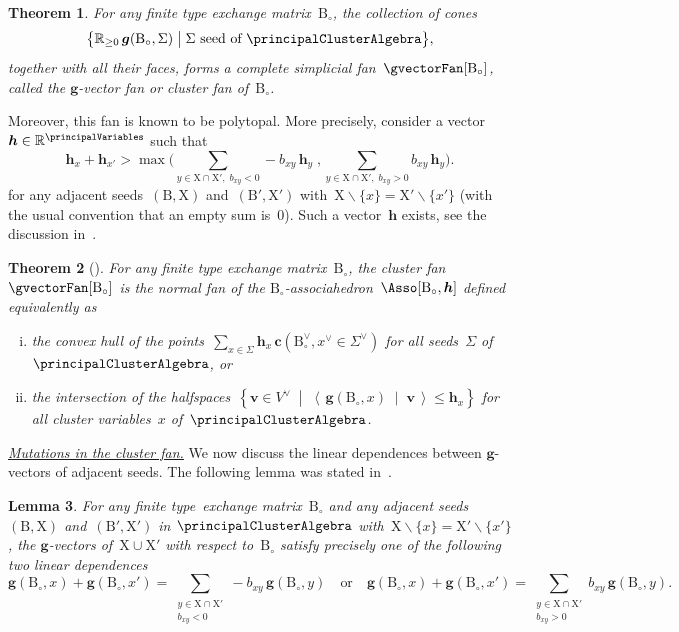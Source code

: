 \documentclass{amsart}
\newtheorem{theorem}{Theorem}[section]
\newtheorem{lemma}[theorem]{Lemma}
\theoremstyle{definition}
\newcommand{\R}{\mathbb{R}} %
\renewcommand{\b}[1]{{\boldsymbol{#1}}} %
\newcommand{\set}[2]{\left\{ #1 \;\middle|\; #2 \right\}} %
\newcommand{\bigset}[2]{\big\{ #1 \;\big|\; #2 \big\}} %
\newcommand{\ssm}{\smallsetminus} %
\newcommand{\dotprod}[2]{\left\langle \, #1 \; \middle| \; #2 \, \right\rangle} %
\newcommand{\darkblue}{\color{darkblue}} %
\newcommand{\defn}[1]{\textsl{\darkblue #1}} %
\newcommand{\para}[1]{\medskip\noindent\uline{\textit{#1.}}} %
\newcommand{\gvectorFull}[2]{\b{g}(#1,#2)} %
\newcommand{\gvectorsFull}[2]{\b{g}(#1,#2)} %
\newcommand{\cvectorFull}[3]{\mathbf{c}(#1,#3 \in #2)} %
\newcommand{\seed}{\Sigma} %
\newcommand{\cluster}{\mathrm{X}} %
\newcommand{\B}{\mathrm{B}} %
\begin{document}
\begin{theorem}
\label{thm:gvectorFanCA}
For any finite type exchange matrix~$\B_\circ$, the collection of cones
\[
\bigset{\R_{\ge0} \, \gvectorsFull{\B_\circ}{\seed}}{\seed \text{ seed of } \principalClusterAlgebra},
\]
together with all their faces, forms a complete simplicial fan~$\gvectorFan[\B_\circ]$, called the \defn{$\b{g}$-vector fan} or \defn{cluster fan} of~$\B_\circ$.
\end{theorem}

Moreover, this fan is known to be polytopal.
More precisely, consider a vector~$\b{h} \in \R^{\principalVariables}$ such that
\[
\b{h}_x + \b{h}_{x'} > \max \Big( \sum_{{y \in \cluster \cap \cluster', \; b_{xy} < 0}} -b_{xy} \, \b{h}_y \;,  \sum_{{y \in \cluster \cap \cluster', \; b_{xy} > 0}} b_{xy} \, \b{h}_y \Big).
\]
for any adjacent seeds~$(\B, \cluster)$ and~$(\B', \cluster')$ with~$\cluster \ssm \{x\} = \cluster' \ssm \{x'\}$ (with the usual convention that an empty sum is~$0$).
Such a vector~$\b{h}$ exists, see the discussion in~\cite[Prop.~28]{HohlwegPilaudStella}.

\begin{theorem}[{\cite[Thm.~26]{HohlwegPilaudStella}}]
\label{thm:generalizedAsso}
For any finite type exchange matrix~$\B_\circ$, the cluster fan~$\gvectorFan[\B_\circ]$ is the normal fan of the \defn{$\B_\circ$-associahedron}~$\Asso[\B_\circ, \b{h}]$ defined equivalently as
\begin{enumerate}[(i)]
\item the convex hull of the points~$\sum_{x \in \seed} \b{h}_x \, \cvectorFull{\B_\circ^\vee}{\seed^\vee}{x^\vee}$ for all seeds~$\seed$ of~$\principalClusterAlgebra$, or
\item the intersection of the halfspaces~$\set{\b{v} \in V^\vee}{\dotprod{\gvectorFull{\B_\circ}{x}}{\b{v}} \le \b{h}_x}$ for all cluster variables~$x$ of~$\principalClusterAlgebra$.
\end{enumerate}
\end{theorem}

\para{Mutations in the cluster fan}
%
We now discuss the linear dependences between $\b{g}$-vectors of adjacent seeds.
The following lemma was stated in~\cite[Lem.~19]{HohlwegPilaudStella}.

\begin{lemma}
\label{lem:linearDependencegvectorsCA}
For any finite type~exchange matrix~$\B_\circ$ and any adjacent seeds~${(\B, \cluster)}$ and~${(\B', \cluster')}$ in $\principalClusterAlgebra$ with~$\cluster \ssm \{x\} = \cluster' \ssm \{x'\}$, the $\b{g}$-vectors of~$\cluster \cup \cluster'$ with respect to~$\B_\circ$ satisfy precisely one of the following two linear dependences
\[
\gvectorFull{\B_\circ}{x} + \gvectorFull{\B_\circ}{x'} = \sum_{\substack{y \in \cluster \cap \cluster' \\ b_{xy} < 0}} -b_{xy} \, \gvectorFull{\B_\circ}{y}
\quad\text{or}\quad
\gvectorFull{\B_\circ}{x} + \gvectorFull{\B_\circ}{x'} = \sum_{\substack{y \in \cluster \cap \cluster' \\ b_{xy} > 0}} b_{xy} \, \gvectorFull{\B_\circ}{y}.
\]
\end{lemma}
\end{document}
